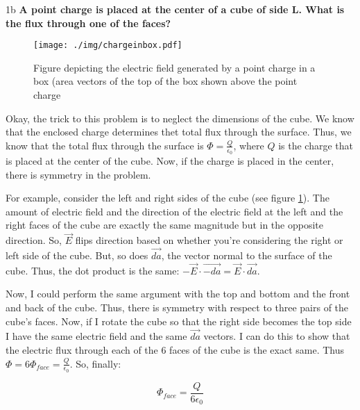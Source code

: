 \begin{homeworkProblem}[Quiz 3, Pr. 1]
    \begin{homeworkSection}{1b}
        \textbf{A point charge is placed at the center of a cube of side
        L. What is the flux through one of the faces?}
        \\

        \begin{figure}[t]
            \centering
            \texttt{[image: ./img/chargeinbox.pdf]}
            \caption{Figure depicting the electric field generated by a
            point charge in a box (area vectors of the top of the box
            shown above the point charge}
            \label{fig:chargeinbox.eps}
        \end{figure}

        Okay, the trick to this problem is to neglect the dimensions of
        the cube. We know that the enclosed charge determines thet total
        flux through the surface. Thus, we know that the total flux
        through the surface is $\Phi = \frac{Q}{\epsilon_0}$, where $Q$
        is the charge that is placed at the center of the cube. Now, if
        the charge is placed in the center, there is symmetry in the
        problem.
        
        For example, consider the left and right sides of the cube (see
        figure \ref{fig:chargeinbox.eps}). The amount of electric field
        and the direction of the electric field at the left and the
        right faces of the cube are exactly the same magnitude but in
        the opposite direction. So, $\vec{E}$ flips direction based on
        whether you're considering the right or left side of the cube.
        But, so does $\vec{da}$, the vector normal to the surface of the
        cube. Thus, the dot product is the same: $-\vec{E}\cdot\vec{-da}
        =\vec{E}\cdot\vec{da}$.

        Now, I could perform the same argument with the top and bottom
        and the front and back of the cube. Thus, there is symmetry with
        respect to three pairs of the cube's faces. Now, if I rotate the
        cube so that the right side becomes the top side I have the same
        electric field and the same $\vec{da}$ vectors. I can do this to
        show that the electric flux through each of the 6 faces of the
        cube is the exact same. Thus $\Phi = 6\Phi_{face} =
        \frac{Q}{\epsilon_0}$. So, finally:

        \[
        \Phi_{face} = \frac{Q}{6\epsilon_0}
        \]


\end{homeworkSection}
\end{homeworkProblem}
